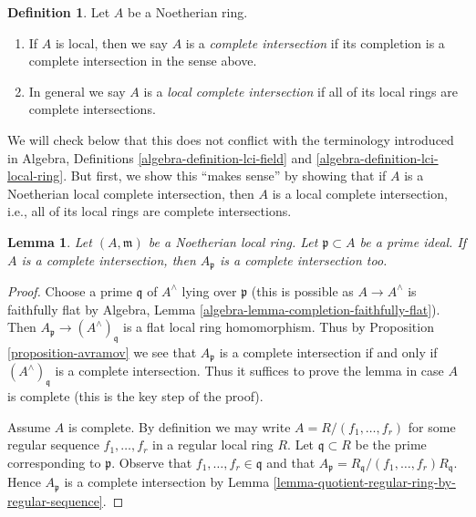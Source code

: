 \documentclass{stacks-project}
\theoremstyle{plain}
\newtheorem{lemma}[subsection]{Lemma}
\theoremstyle{definition}
\newtheorem{definition}[subsection]{Definition}
\theoremstyle{remark}
\numberwithin{equation}{subsection}
\begin{document}
\begin{definition}
\label{definition-lci}
Let $A$ be a Noetherian ring.
\begin{enumerate}
\item If $A$ is local, then we say $A$ is a {\it complete intersection}
if its completion is a complete intersection in the sense above.
\item In general we say $A$ is a {\it local complete intersection}
if all of its local rings are complete intersections.
\end{enumerate}
\end{definition}

\noindent
We will check below that this does not conflict with the terminology
introduced in
Algebra, Definitions \ref{algebra-definition-lci-field} and
\ref{algebra-definition-lci-local-ring}.
But first, we show this ``makes sense'' by showing
that if $A$ is a Noetherian
local complete intersection, then $A$ is a local complete intersection,
i.e., all of its local rings are complete intersections.

\begin{lemma}
\label{lemma-ci-good}
Let $(A, \mathfrak m)$ be a Noetherian local ring. Let
$\mathfrak p \subset A$ be a prime ideal. If $A$ is a complete
intersection, then $A_\mathfrak p$ is a complete intersection too.
\end{lemma}

\begin{proof}
Choose a prime $\mathfrak q$ of $A^\wedge$ lying over $\mathfrak p$
(this is possible as $A \to A^\wedge$ is faithfully flat by
Algebra, Lemma \ref{algebra-lemma-completion-faithfully-flat}).
Then $A_\mathfrak p \to (A^\wedge)_\mathfrak q$ is a flat local
ring homomorphism. Thus by Proposition \ref{proposition-avramov}
we see that $A_\mathfrak p$ is a complete intersection if and only if
$(A^\wedge)_\mathfrak q$ is a complete intersection. Thus it suffices
to prove the lemma in case $A$ is complete (this is the key step
of the proof).

\medskip\noindent
Assume $A$ is complete. By definition we may write
$A = R/(f_1, \ldots, f_r)$ for some regular sequence
$f_1, \ldots, f_r$ in a regular local ring $R$.
Let $\mathfrak q \subset R$ be the prime corresponding to $\mathfrak p$.
Observe that $f_1, \ldots, f_r \in \mathfrak q$ and that
$A_\mathfrak p = R_\mathfrak q/(f_1, \ldots, f_r)R_\mathfrak q$.
Hence $A_\mathfrak p$ is a complete intersection by
Lemma \ref{lemma-quotient-regular-ring-by-regular-sequence}.
\end{proof}
\end{document}
